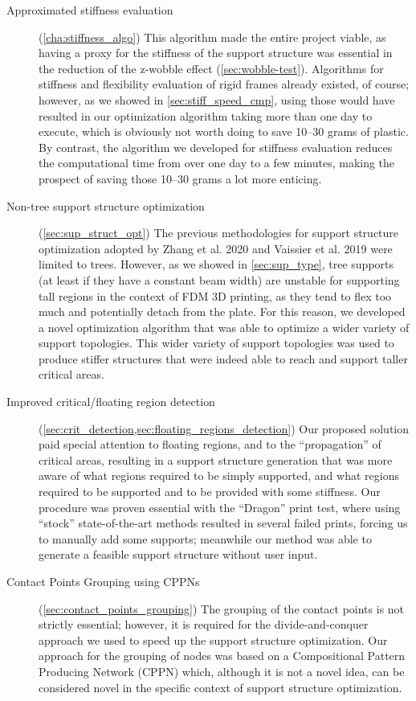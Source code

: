 \begin{description}
\item[Approximated stiffness evaluation] (\cref{cha:stiffness_algo})
This algorithm made the entire project viable, as having a proxy for the stiffness
of the support structure was essential in the reduction of the z-wobble effect (\cref{sec:wobble-test}).
Algorithms for stiffness and flexibility evaluation of rigid frames already existed, of course;
however, as we showed in \cref{sec:stiff_speed_cmp}, using those would have resulted
in our optimization algorithm taking more than one day to execute, which is obviously not worth
doing to save 10--30 grams of plastic. By contrast, the algorithm we developed for stiffness
evaluation reduces the computational time from over one day to a few minutes, making the prospect
of saving those 10--30 grams a lot more enticing.

\item[Non-tree support structure optimization] (\cref{sec:sup_struct_opt})
The previous methodologies for support structure optimization adopted
by Zhang et al. 2020 \cite{ZHANG2020117} and Vaissier et al. 2019 \cite{VAISSIER201911}
were limited to trees. However, as we showed in
\cref{sec:sup_type}, tree supports (at least if they have a constant beam width)
are unstable for supporting tall regions in the context of FDM 3D printing, 
as they tend to flex too much and potentially detach from the plate.
For this reason, we developed a novel optimization algorithm that was able
to optimize a wider variety of support topologies. This wider variety
of support topologies was used to produce stiffer structures that were indeed
able to reach and support taller critical areas.

\item[Improved critical/floating region detection] (\cref{sec:crit_detection,sec:floating_regions_detection})
Our proposed solution paid special attention to floating regions, and to the ``propagation'' of critical
areas, resulting in a support structure generation that was more aware of what regions required to be simply
supported, and what regions required to be supported and to be provided with some stiffness.
Our procedure was proven essential with the ``Dragon'' print test, where using ``stock'' state-of-the-art
methods resulted in several failed prints, forcing us to manually add some supports; meanwhile
our method was able to generate a feasible support structure without user input.


\item[Contact Points Grouping using CPPNs] (\cref{sec:contact_points_grouping})
The grouping of the contact points is not strictly essential; however, it is required
for the divide-and-conquer approach we used to speed up the support structure optimization.
Our approach for the grouping of nodes was based on a Compositional Pattern Producing
Network (CPPN) which, although it is not a novel idea, can be considered novel in the specific
context of support structure optimization.


\end{description}

